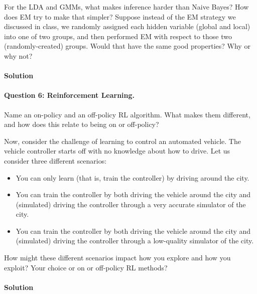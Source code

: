 \documentclass[12pt,letterpaper]{article}
\begin{document}
For the LDA and GMMs, what makes inference harder than Naive Bayes?  How does EM try to make that simpler?  Suppose instead of the EM strategy we discussed in class, we randomly assigned each hidden variable (global and local) into one of two groups, and then performed EM with respect to those two (randomly-created) groups.  Would that have the same good properties?  Why or why not?  

\newpage

\paragraph{Solution}


\newpage 

\paragraph{Question 6: Reinforcement Learning.} 

Name an on-policy and an off-policy RL algorithm.  What makes them different, and how does this relate to being on or off-policy?

Now, consider the challenge of learning to control an automated vehicle.  The vehicle controller starts off with no knowledge about how to drive.  Let us consider three different scenarios:
\begin{itemize}
\item You can only learn (that is, train the controller) by driving
  around the city.
\item You can train the controller by both driving the vehicle around
  the city and (simulated) driving the controller through a very
  accurate simulator of the city.
\item You can train the controller by both driving the vehicle around
  the city and (simulated) driving the controller through a
  low-quality simulator of the city.
\end{itemize}
How might these different scenarios impact how you explore and how you
exploit?  Your choice or on or off-policy RL methods? 

\newpage

\paragraph{Solution}
\end{document}
